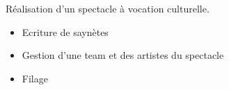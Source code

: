 \documentclass[10pt,a4paper]{altacv}
\begin{document}
\divider

Réalisation d'un spectacle à vocation culturelle.
\begin{itemize}[leftmargin=7mm]
\item Ecriture de saynètes
\item Gestion d'une team et des artistes du spectacle
\item Filage
\end{itemize}






\end{document}
